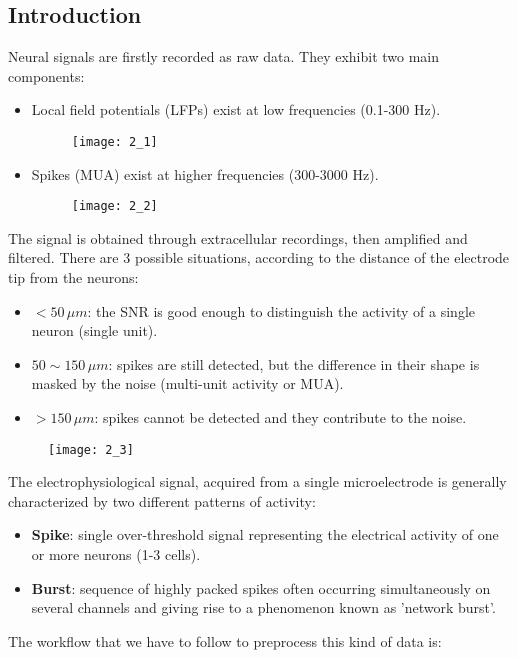 \subsection{Introduction}
Neural signals are firstly recorded as raw data. They exhibit two main components:
\begin{itemize}
    \item Local field potentials (LFPs) exist at low frequencies (0.1-300 Hz).
          \begin{figure}[H]
              \texttt{[image: 2\_1]}
              \centering
          \end{figure}
    \item Spikes (MUA) exist at higher frequencies (300-3000 Hz).
          \begin{figure}[H]
              \texttt{[image: 2\_2]}
              \centering
          \end{figure}
\end{itemize}
The signal is obtained through extracellular recordings, then amplified and filtered. There are 3 possible situations, according to the distance of the electrode tip from the neurons:
\begin{itemize}
    \item \(<50\,\mu{m}\): the SNR is good enough to distinguish the activity of a single neuron (single unit).
    \item \(50\sim150\,\mu{m}\): spikes are still detected, but the difference in their shape is masked by the noise (multi-unit activity or MUA).
    \item \(>150\,\mu{m}\): spikes cannot be detected and they contribute to the noise.
\end{itemize}
\begin{figure}[H]
    \texttt{[image: 2\_3]}
    \centering
\end{figure}
The electrophysiological signal, acquired from a single microelectrode is generally characterized by two different patterns of activity:
\begin{itemize}
    \item \textbf{Spike}: single over-threshold signal representing the electrical activity of one or more neurons (1-3 cells).
    \item \textbf{Burst}: sequence of highly packed spikes often occurring simultaneously on several channels and giving rise to a phenomenon known as 'network burst'.
\end{itemize}
The workflow that we have to follow to preprocess this kind of data is:
